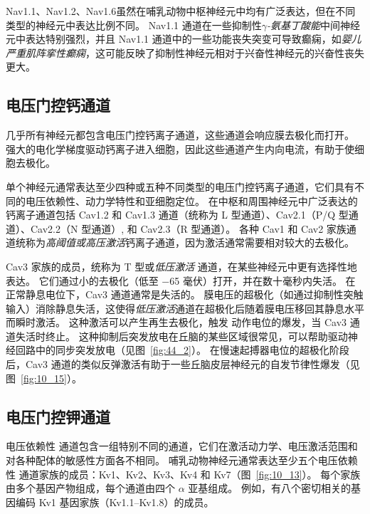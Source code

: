 Nav1.1、Nav1.2、Nav1.6虽然在哺乳动物中枢神经元中均有广泛表达，但在不同类型的神经元中表达比例不同。
Nav1.1 通道在一些抑制性\textit{$\gamma$-氨基丁酸能}中间神经元中表达特别强烈，并且 Nav1.1 通道中的一些功能丧失突变可导致癫痫，如\textit{婴儿严重肌阵挛性癫痫}，这可能反映了抑制性神经元相对于兴奋性神经元的兴奋性丧失更大。



\subsection{电压门控钙通道}

几乎所有神经元都包含电压门控钙离子通道，这些通道会响应膜去极化而打开。
强大的电化学梯度驱动钙离子进入细胞，因此这些通道产生内向电流，有助于使细胞去极化。


单个神经元通常表达至少四种或五种不同类型的电压门控钙离子通道，它们具有不同的电压依赖性、动力学特性和亚细胞定位。
在中枢和周围神经元中广泛表达的钙离子通道包括 Cav1.2 和 Cav1.3 通道（统称为 L 型通道）、Cav2.1（P/Q 型通道）、Cav2.2（N 型通道）, 和 Cav2.3（R 型通道）。
各种 Cav1 和 Cav2 家族通道统称为\textit{高阈值或高压激活}钙离子通道，因为激活通常需要相对较大的去极化。


Cav3 家族的成员，统称为 T 型或\textit{低压激活} 通道，在某些神经元中更有选择性地表达。
它们通过小的去极化（低至 −65 毫伏）打开，并在数十毫秒内失活。
在正常静息电位下，Cav3 通道通常是失活的。
膜电压的超极化（如通过抑制性突触输入）消除静息失活，这使得\textit{低压激活}通道在超极化后随着膜电压移回其静息水平而瞬时激活。
这种激活可以产生再生去极化，触发  动作电位的爆发，当 Cav3 通道失活时终止。 
这种抑制后突发放电在丘脑的某些区域很常见，可以帮助驱动神经回路中的同步突发放电（见图~\ref{fig:44_2}）。 
在慢速起搏器电位的超极化阶段后，Cav3 通道的类似反弹激活有助于一些丘脑皮层神经元的自发节律性爆发（见图~\ref{fig:10_15}）。



\subsection{电压门控钾通道}

电压依赖性  通道包含一组特别不同的通道，它们在激活动力学、电压激活范围和对各种配体的敏感性方面各不相同。
哺乳动物神经元通常表达至少五个电压依赖性  通道家族的成员：Kv1、Kv2、Kv3、Kv4 和 Kv7（图~\ref{fig:10_13}）。
每个家族由多个基因产物组成，每个通道由四个 $\alpha$ 亚基组成。
例如，有八个密切相关的基因编码 Kv1 基因家族（Kv1.1–Kv1.8）的成员。


